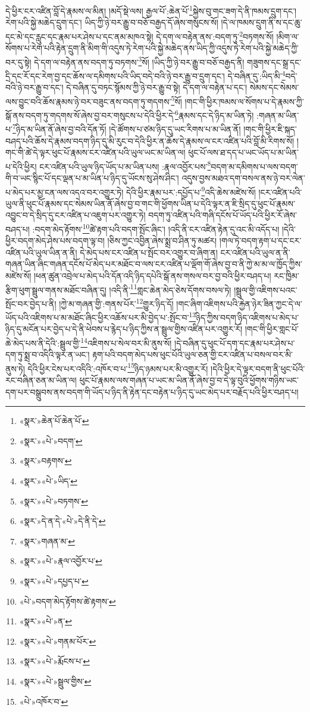 དེ་ཕྱིར་ངར་འཛིན་བློ་དེ་རྣམས་ལ་མིན། །མདོ་སྡེ་ལས། རྒྱལ་པོ་:ཆེན་པོ་\footnote{«སྣར་»ཆེན་པོ་ཆེན་པོ་}སྐྱེས་བུ་གང་ཟག་དེ་ནི་ཁམས་དྲུག་དང་། རེག་པའི་སྐྱེ་མཆེད་དྲུག་དང་། ཡིད་ཀྱི་ཉེ་བར་རྒྱུ་བ་བཅོ་བརྒྱད་དོ་ཞེས་གསུངས་སོ། །དེ་ལ་ཁམས་དྲུག་ནི་ས་དང་ཆུ་དང་མེ་དང་རླུང་དང་རྣམ་པར་ཤེས་པ་དང་ནམ་མཁའ་སྟེ། དེ་དག་ལ་བརྟེན་ནས་:བདག་ཏུ་\footnote{«སྣར་»«པེ་»བདག་}བཏགས་སོ། །མིག་ལ་སོགས་པ་རེག་པའི་རྟེན་དྲུག་ནི་མིག་གི་འདུས་ཏེ་རེག་པའི་སྐྱེ་མཆེད་ནས་ཡིད་ཀྱི་འདུས་ཏེ་རེག་པའི་སྐྱེ་མཆེད་ཀྱི་བར་དུ་སྟེ། དེ་དག་ལ་བརྟེན་ནས་བདག་ཏུ་བཏགས་\footnote{«སྣར་»བརྟགས་}སོ། །ཡིད་ཀྱི་ཉེ་བར་རྒྱུ་བ་བཅོ་བརྒྱད་ནི། གཟུགས་དང་སྒྲ་དང་དྲི་དང་རོ་དང་རེག་བྱ་དང་ཆོས་ལ་དམིགས་པའི་ཡིད་བདེ་བའི་ཉེ་བར་རྒྱུ་བ་དྲུག་དང་། དེ་བཞིན་དུ་:ཡིད་མི་\footnote{«སྣར་»«པེ་»ཡིད་}བདེ་བའི་ཉེ་བར་རྒྱུ་བ་དང་། དེ་བཞིན་དུ་བཏང་སྙོམས་ཀྱི་ཉེ་བར་རྒྱུ་བ་སྟེ། དེ་དག་ལ་བརྟེན་པ་དང་། སེམས་དང་སེམས་ལས་བྱུང་བའི་ཆོས་རྣམས་ཉེ་བར་བཟུང་ནས་བདག་ཏུ་གདགས་\footnote{«སྣར་»«པེ་»བཏགས་}སོ། །གང་གི་ཕྱིར་ཁམས་ལ་སོགས་པ་དེ་རྣམས་ཀྱི་སྒོ་ནས་བདག་ཏུ་གདགས་སོ་ཞེས་བྱ་བར་གསུངས་པ་དེའི་ཕྱིར་དེ་\footnote{«སྣར་»དེ་ན་དེ་«པེ་»དེ་ནི་དེ་}རྣམས་དང་དེ་ཉིད་མ་ཡིན་ཏེ། :གཞན་མ་ཡིན་པ་\footnote{«སྣར་»གཞན་མ་}ཉིད་མ་ཡིན་ནོ་ཞེས་བྱ་བའི་དོན་ཏོ། །དེ་ཚོགས་པ་ཙམ་ཉིད་དུ་ཡང་རིགས་པ་མ་ཡིན་ནོ། །གང་གི་ཕྱིར་ཇི་སྐད་བཤད་པའི་ཆོས་དེ་རྣམས་བདག་ཉིད་དུ་མི་རུང་བ་དེའི་ཕྱིར་ན་ཆོས་དེ་རྣམས་ལ་ངར་འཛིན་པའི་བློ་མི་རིགས་སོ། །གང་གི་ཚེ་དེ་ལྟར་ཕུང་པོ་རྣམས་ངར་འཛིན་པའི་ཡུལ་ཡང་མ་ཡིན་ལ། ཕུང་པོ་ལས་ཐ་དད་པ་ཡང་ཡོད་པ་མ་ཡིན་པ་དེའི་ཕྱིར། ངར་འཛིན་པའི་ཡུལ་ཉིད་ཡོད་པ་མ་ཡིན་པས། :རྣལ་འབྱོར་པས་\footnote{«སྣར་»«པེ་»རྣལ་འབྱོར་པ་}བདག་མ་དམིགས་པ་ལས་བདག་གི་བ་ཡང་སྙིང་པོ་དང་ལྡན་པ་མ་ཡིན་པ་ཉིད་དུ་ཡོངས་སུ་ཤེས་ཤིང་། འདུས་བྱས་མཐའ་དག་བསལ་ནས་ཉེ་བར་ལེན་པ་མེད་པར་མྱ་ངན་ལས་འདའ་བར་འགྱུར་ཏེ། དེའི་ཕྱིར་རྣམ་པར་:དཔྱོད་པ་\footnote{«སྣར་»«པེ་»དཔྱད་པ་}འདི་ཆེས་མཛེས་སོ། །ངར་འཛིན་པའི་ཡུལ་ནི་ཕུང་པོ་རྣམས་དང་སེམས་ཡིན་ནོ་ཞེས་བྱ་བ་གང་གི་ཕྱོགས་ཡིན་པ་དེའི་ལྟར་ན་ཇི་སྲིད་དུ་ཕུང་པོ་རྣམས་འབྱུང་བ་དེ་སྲིད་དུ་ངར་འཛིན་པ་འཇུག་པར་འགྱུར་ཏེ། བདག་ཏུ་འཛིན་པའི་གཞི་དངོས་པོ་ཡོད་པའི་ཕྱིར་རོ་ཞེས་བཤད་པ། :བདག་མེད་རྟོགས་\footnote{«པེ་»བདག་མེད་རྟོགས་ཚེ་རྟགས་}ཚེ་རྟག་པའི་བདག་སྤོང་ཞིང་། །འདི་ནི་ངར་འཛིན་རྟེན་དུ་འང་མི་འདོད་པ། །དེའི་ཕྱིར་བདག་མེད་ཤེས་པས་བདག་ལྟ་བ། །ཅིས་ཀྱང་འབྱིན་ཞེས་སྨྲ་བ་ཤིན་ཏུ་མཚར། །གལ་ཏེ་བདག་རྟག་པ་དང་ངར་འཛིན་པའི་ཡུལ་ཡིན་ན་ནི། དེ་མེད་པས་ངར་འཛིན་པ་སྤོང་བར་འགྱུར་བ་ཞིག་ན། ངར་འཛིན་པའི་ཡུལ་ན་ནི་གཞན་ཡིན་ཞིང་གཞན་དངོས་པོ་མེད་པར་མཐོང་བ་ལས་ངར་འཛིན་པ་ལྡོག་གོ་ཞེས་བྱ་བ་ནི་ཀྱེ་མ་མ་ལ་ཁྱོད་ཀྱིས་མཛེས་སོ། །ཕན་ཚུན་འབྲེལ་པ་མེད་པའི་དོན་འདི་ཉིད་དཔེའི་སྒོ་ནས་གསལ་བར་བྱ་བའི་ཕྱིར་བཤད་པ། རང་ཁྱིམ་རྩིག་ཕུག་སྦྲུལ་གནས་མཐོང་བཞིན་དུ། །འདི་ནི་\footnote{«སྣར་»«པེ་»ན་}གླང་ཆེན་མེད་ཅེས་དོགས་བསལ་ཏེ། །སྦྲུལ་གྱི་འཇིགས་པའང་སྤོང་བར་བྱེད་པ་ནི། །ཀྱེ་མ་གཞན་གྱི་:གནས་པོར་\footnote{«སྣར་»«པེ་»གནམ་པོར་}གྱུར་ཉིད་དོ། །གང་ཞིག་འཇིགས་པའི་རྐྱེན་ཉེར་ཟིན་ཀྱང་དེ་ལ་ཡོད་པའི་འཇིགས་པ་མ་མཐོང་ཞིང་ཕྱིར་འཆོས་པར་མི་བྱེད་པ་:སྤོང་བ་\footnote{«སྣར་»«པེ་»རྨོངས་པ་}ཉིད་ཀྱིས་བདག་ཉིད་འཇིགས་པ་མེད་པ་ཉིད་དུ་མངོན་པར་བྱེད་པ་དེ་ནི་ཕེབས་པ་རྙེད་པ་ཉིད་ཀྱིས་ན་སྦྲུལ་གྱིས་འཛིན་པར་འགྱུར་རོ། །གང་གི་ཕྱིར་གླང་པོ་ཆེ་མེད་པས་ནི་དེའི་:སྦྲུལ་གྱི་\footnote{«སྣར་»«པེ་»སྦྲུལ་གྱིས་}འཇིགས་པ་སེལ་བར་མི་ནུས་སོ། །དེ་བཞིན་དུ་ཕུང་པོ་དག་དང་རྣམ་པར་ཤེས་པ་དག་ཏུ་སྨྲ་བ་འདིའི་ལྟར་ན་ཡང་། རྟག་པའི་བདག་མེད་པས་ཕུང་པོའི་ཡུལ་ཅན་གྱི་ངར་འཛིན་པ་བསལ་བར་མི་ནུས་ཏེ། དེའི་ཕྱིར་ངེས་པར་འདིའི་:འཁོར་བ་པ་\footnote{«པེ་»འཁོར་བ་}ཉིད་ཉམས་པར་མི་འགྱུར་རོ། །དེའི་ཕྱིར་དེ་ལྟར་བདག་ནི་ཕུང་པོའི་རང་བཞིན་ཅན་མ་ཡིན་ལ། ཕུང་པོ་རྣམས་ལས་གཞན་པ་ཡང་མ་ཡིན་ནོ་ཞེས་བྱ་བ་དེ་ལྟ་བུའི་ཕྱོགས་གཉིས་ཡང་དག་པར་བསྒྲུབས་ནས་བདག་གི་ཡོད་པ་ཉིད་ནི་རྟེན་དང་བརྟེན་པ་ཉིད་དུ་ཡང་མེད་པར་བརྗོད་པའི་ཕྱིར་བཤད་པ། 